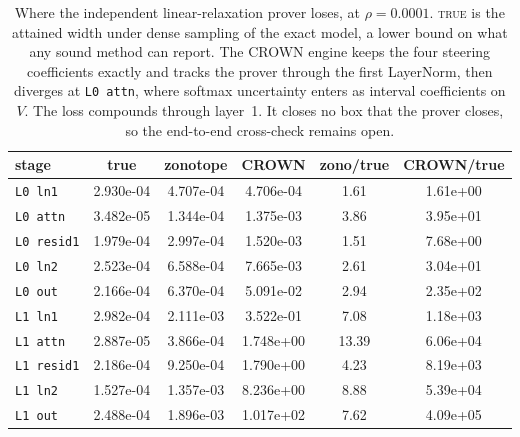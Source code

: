\documentclass[10pt,journal]{IEEEtran}
\begin{document}
\begin{table}[t]
\centering
\caption{Where the independent linear-relaxation prover loses, at $\rho=\num{0.0001}$. \textsc{true} is the attained width under dense sampling of the exact model, a lower bound on what any sound method can report. The CROWN engine keeps the four steering coefficients exactly and tracks the prover through the first LayerNorm, then diverges at \texttt{L0 attn}, where softmax uncertainty enters as interval coefficients on $V$. The loss compounds through layer~1. It closes no box that the prover closes, so the end-to-end cross-check remains open.}
\label{tab:crown}
\begin{tabular}{l S[table-format=1.3e2] S[table-format=1.3e2] S[table-format=1.3e2] S[table-format=2.2] S[table-format=1.2e2]}
\toprule
stage & {true} & {zonotope} & {CROWN} & {zono/true} & {CROWN/true} \\
\midrule
\texttt{L0 ln1} & 2.930e-04 & 4.707e-04 & 4.706e-04 & 1.61 & 1.61e+00 \\
\texttt{L0 attn} & 3.482e-05 & 1.344e-04 & 1.375e-03 & 3.86 & 3.95e+01 \\
\texttt{L0 resid1} & 1.979e-04 & 2.997e-04 & 1.520e-03 & 1.51 & 7.68e+00 \\
\texttt{L0 ln2} & 2.523e-04 & 6.588e-04 & 7.665e-03 & 2.61 & 3.04e+01 \\
\texttt{L0 out} & 2.166e-04 & 6.370e-04 & 5.091e-02 & 2.94 & 2.35e+02 \\
\texttt{L1 ln1} & 2.982e-04 & 2.111e-03 & 3.522e-01 & 7.08 & 1.18e+03 \\
\texttt{L1 attn} & 2.887e-05 & 3.866e-04 & 1.748e+00 & 13.39 & 6.06e+04 \\
\texttt{L1 resid1} & 2.186e-04 & 9.250e-04 & 1.790e+00 & 4.23 & 8.19e+03 \\
\texttt{L1 ln2} & 1.527e-04 & 1.357e-03 & 8.236e+00 & 8.88 & 5.39e+04 \\
\texttt{L1 out} & 2.488e-04 & 1.896e-03 & 1.017e+02 & 7.62 & 4.09e+05 \\
\bottomrule
\end{tabular}
\end{table}
\end{document}
